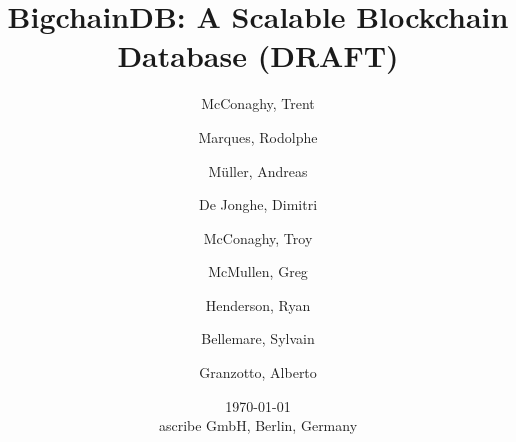 \documentclass[a4paper]{scrartcl}
\title{\LARGE BigchainDB: A Scalable Blockchain Database (DRAFT)}
\author{
  McConaghy, Trent\\
  \and
  Marques, Rodolphe\\
 \and
  M\"{u}ller, Andreas\\
 \and
  De Jonghe, Dimitri\\
 \and
  McConaghy, Troy\\
 \and
  McMullen, Greg \\
 \and
  Henderson, Ryan \\
 \and
  Bellemare, Sylvain\\
 \and
  Granzotto, Alberto
}
\date{\normalsize \today\\ascribe GmbH, Berlin, Germany}
\begin{document}
\maketitle















\begin{appendices}




\end{appendices}

{\footnotesize{}}

\end{document}
